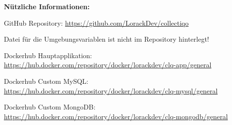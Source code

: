 \textbf{Nützliche Informationen:}\par
\vspace{0.5cm}
GitHub Repository: \url{https://github.com/LorackDev/collectiqo}\par
Datei für die Umgebungsvariablen ist nicht im Repository hinterlegt!\par
\vspace{0.5cm}
Dockerhub Hauptapplikation: \url{https://hub.docker.com/repository/docker/lorackdev/clq-app/general}\par
Dockerhub Custom MySQL: \url{https://hub.docker.com/repository/docker/lorackdev/clq-mysql/general}\par
Dockerhub Custom MongoDB: \url{https://hub.docker.com/repository/docker/lorackdev/clq-mongodb/general}\par